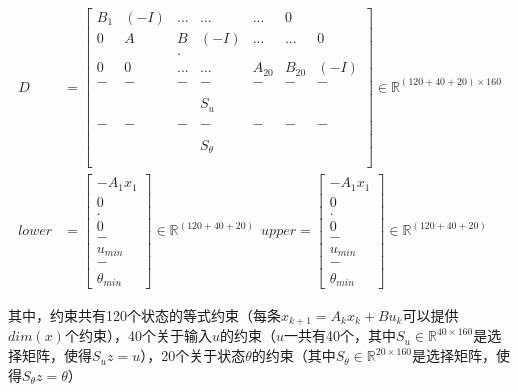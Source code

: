 \begin{align}     D &= \begin{bmatrix}         B_1 & (-I)  & ...   & ...   & ...   & 0 \\         0   & A     & B     & (-I)& ...  & ...   & 0 \\         \   & \     & .     & \ \\         0   & 0     & ...   & ...& A_{20} & B_{20} & (-I)\\         -   & -     & -   & - & - & - &-\\           \   & \     &      & \ \\            &      &    &S_u  &  & \\                     \   & \     &      & \ \\  -   & -     & -   & - & - & -&-\\            \   & \     &      & \ \\             &      &    &S_{\theta}  &  & \\                       \   & \     &      & \ \\     \end{bmatrix} \in \mathbb R^{(120+40+20) \times 160}\\      lower &= \begin{bmatrix}         -A_1 x_1 \\         0 \\         . \\          0 \\         - \\         u_{min}\\         -\\         \theta_{min}     \end{bmatrix}\in\mathbb R^{(120+40+20)}     \ \          upper = \begin{bmatrix}         -A_1 x_1 \\         0 \\         . \\          0 \\         - \\         u_{min}\\         -\\         \theta_{min}     \end{bmatrix}\in\mathbb R^{(120+40+20)} \end{align}

其中，约束共有120个状态的等式约束（每条$x_{k+1}=A_kx_k+Bu_k$可以提供$dim(x)$个约束），40个关于输入$u$的约束（$u$一共有40个，其中$S_u \in \mathbb R^{40 \times 160}$是选择矩阵，使得$S_uz=u$），20个关于状态$\theta$的约束（其中$S_\theta \in \mathbb R^{20 \times 160}$是选择矩阵，使得$S_\theta z=\theta$）

